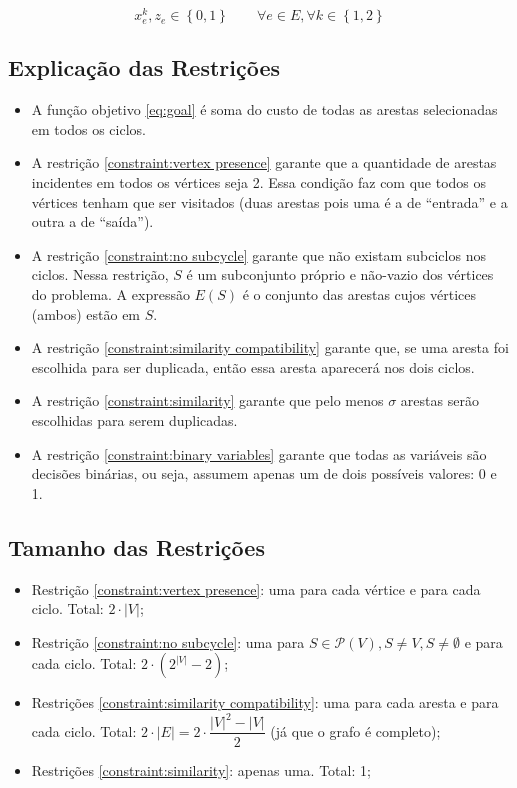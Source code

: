 \documentclass{article}
\newcommand{\Set}[1]{\ensuremath{\left\{#1\right\}}}
\newcommand{\partsof}[1]{\ensuremath{\mathcal{P}\left(#1\right)}}
\newcommand{\abs}[1]{\ensuremath{\left| #1 \right|}}
\newcommand{\binary}{\ensuremath{\Set{0, 1}}}
\newcommand{\edge}{\ensuremath{e}}
\newcommand{\edges}{\ensuremath{E}}
\newcommand{\vertices}{\ensuremath{V}}
\newcommand{\ncycles}{2}
\newcommand{\allCycles}{\ensuremath{\Set{1, \ncycles}}}
\newcommand{\cycle}{\ensuremath{k}}
\newcommand{\subvertices}{\ensuremath{S}}
\newcommand{\X}{\ensuremath{x}}
\newcommand{\xke}{\ensuremath{\X^{\cycle}_{\edge}}}
\newcommand{\Z}{\ensuremath{z}}
\newcommand{\ze}{\ensuremath{\Z_{\edge}}}
\newcommand{\similarity}{\ensuremath{\sigma}}
\begin{document}
\begin{equation}
	\label{constraint:binary variables}
	\xke, \ze \in \binary
	\qquad
	\forall \edge \in \edges,
	\forall \cycle \in \allCycles
\end{equation}

\subsection{Explicação das Restrições}
\label{subsec: constraints explanation}

\begin{itemize}
    \item A função objetivo \eqref{eq:goal} é soma do custo de todas as arestas selecionadas em todos os ciclos.
    \item A restrição \eqref{constraint:vertex presence} garante que a quantidade de arestas incidentes em todos os vértices seja 2. Essa condição faz com que todos os vértices tenham que ser visitados (duas arestas pois uma é a de ``entrada'' e a outra a de ``saída'').
    \item A restrição \eqref{constraint:no subcycle} garante que não existam subciclos nos ciclos. Nessa restrição, $\subvertices$ é um subconjunto próprio e não-vazio dos vértices do problema. A expressão $\edges(\subvertices)$ é o conjunto das arestas cujos vértices (ambos) estão em $\subvertices$.
    \item A restrição \eqref{constraint:similarity compatibility} garante que, se uma aresta foi escolhida para ser duplicada, então essa aresta aparecerá nos dois ciclos.
    \item A restrição \eqref{constraint:similarity} garante que pelo menos $\similarity$ arestas serão escolhidas para serem duplicadas.
    \item A restrição \eqref{constraint:binary variables} garante que todas as variáveis são decisões binárias, ou seja, assumem apenas um de dois possíveis valores: 0 e 1.
\end{itemize}

\subsection{Tamanho das Restrições}
\label{subsec:constraints size}

\begin{itemize}
	\item Restrição \eqref{constraint:vertex presence}: uma para cada vértice e para cada ciclo. Total: $\ncycles \cdot \abs{\vertices}$;
	\item Restrição \eqref{constraint:no subcycle}: uma para $\subvertices \in \partsof{\vertices}, \subvertices \neq \vertices, \subvertices \neq \emptyset$ e para cada ciclo. Total: $\ncycles \cdot \left( 2^{\abs{\vertices}} - 2\right)$;
	\item Restrições \eqref{constraint:similarity compatibility}: uma para cada aresta e para cada ciclo. Total: $\ncycles \cdot \abs{\edges} = \ncycles \cdot \dfrac{\abs{\vertices}^2 - \abs{\vertices}}{2}$ (já que o grafo é completo);
	\item Restrições \ref{constraint:similarity}: apenas uma. Total: 1;
\end{itemize}
\end{document}
